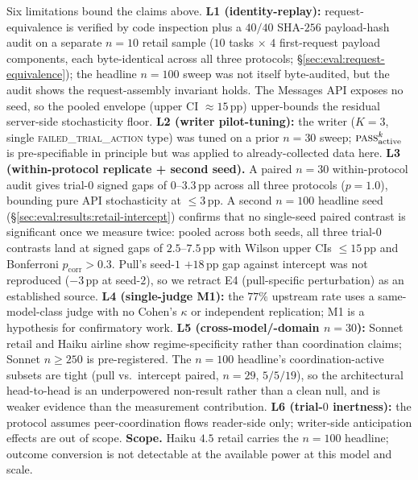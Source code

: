 Six limitations bound the claims above.
\textbf{L1 (identity-replay):} request-equivalence is verified by
code inspection plus a $40/40$ SHA-$256$ payload-hash audit on a
separate $n{=}10$ retail sample ($10$ tasks $\times$ $4$
first-request payload components, each byte-identical across
all three protocols;
\S\ref{sec:eval:request-equivalence}); the headline $n{=}100$
sweep was not itself byte-audited, but the audit shows the
request-assembly invariant holds. The Messages API exposes no
seed, so the pooled envelope (upper CI ${\approx}15$\,pp)
upper-bounds the residual server-side stochasticity floor.
\textbf{L2 (writer pilot-tuning):} the writer ($K{=}3$, single
\textsc{failed\_trial\_action} type) was tuned on a prior $n{=}30$
sweep; $\textsc{pass}^k_{\mathrm{active}}$ is pre-specifiable in
principle but was applied to already-collected data here.
\textbf{L3 (within-protocol replicate + second seed).} A paired
$n{=}30$ within-protocol audit gives trial-$0$ signed gaps of
$0$--$3.3$\,pp across all three protocols ($p{=}1.0$), bounding
pure API stochasticity at $\leq 3$\,pp. A second
$n{=}100$ headline seed
(\S\ref{sec:eval:results:retail-intercept}) confirms that no
single-seed paired contrast is significant once we measure
twice: pooled across both seeds, all three trial-$0$ contrasts
land at signed gaps of $2.5$--$7.5$\,pp with Wilson upper CIs
$\leq 15$\,pp and Bonferroni $p_{\text{corr}} > 0.3$. Pull's
seed-$1$ $+18$\,pp gap against intercept was not reproduced
($-3$\,pp at seed-$2$), so we retract E4 (pull-specific
perturbation) as an established source.
\textbf{L4 (single-judge M1):} the $77\%$ upstream rate uses a
same-model-class judge with no Cohen's $\kappa$ or independent
replication; M1 is a hypothesis for confirmatory work.
\textbf{L5 (cross-model/-domain $n{=}30$):} Sonnet retail and
Haiku airline show regime-specificity rather than coordination
claims; Sonnet $n{\geq}250$ is pre-registered. The $n{=}100$
headline's coordination-active subsets are tight (pull vs.\
intercept paired, $n{=}29$, $5/5/19$), so the architectural
head-to-head is an underpowered non-result rather than a clean
null, and is weaker evidence than the measurement contribution.
\textbf{L6 (trial-$0$ inertness):} the protocol assumes
peer-coordination flows reader-side only; writer-side anticipation
effects are out of scope.
\textbf{Scope.} Haiku $4.5$ retail carries the $n{=}100$
headline; outcome conversion is not detectable at the available
power at this model and scale.
